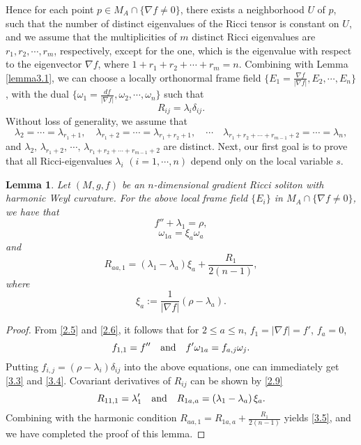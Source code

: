 \documentclass{amsart}
\newtheorem{lemma}[theorem]{Lemma}
\theoremstyle{definition}
\theoremstyle{remark}
\numberwithin{equation}{section}
\begin{document}
	Hence for each point $p\in M_A \cap \{ \nabla f \neq 0  \}$, there exists a neighborhood $U$ of $p$, 
	such that the number of distinct eigenvalues of the Ricci tensor is constant on $U$,
	and we assume that the multiplicities of $m$ distinct Ricci eigenvalues are $r_{1}, r_{2}, \cdots, r_{m}$, respectively, 
	except for the one, which is the eigenvalue with respect to the eigenvector $\nabla f$,
	where $1+r_{1}+r_{2}+ \cdots+ r_{m}=n $.
	Combining with Lemma \ref{lemma3.1},
	we can choose a locally orthonormal frame field
	$\{E_1= \frac{\nabla f}{|\nabla f| }, E_2, \cdots,  E_n\}$,
	with the dual $\{\omega_1= \frac{d f}{|\nabla f| }, \omega_2, \cdots, \omega_n\}$
	such that 
	\begin{equation}\label{3.2}
	R_{ij}=\lambda_i \delta_{ij}.
	\end{equation}
	Without loss of generality, we assume that 
	\[
	\lambda_{2}=\cdots=\lambda_{r_1+1}, \quad
	\lambda_{r_1+2}=\cdots=\lambda_{r_1+r_2+1},\quad
	\cdots  \quad 
	\lambda_{r_1+r_2+\cdots+r_{m-1}+2}=\cdots=\lambda_{n},
	\]
	and $\lambda_{2},\, \lambda_{r_1+2},\,\cdots,\,	\lambda_{r_1+r_2+\cdots+r_{m-1}+2}$
	are distinct.
	Next, our first goal is to prove that all Ricci-eigenvalues $ \lambda_i $ $(i=1, \cdots ,n)$
	depend only on the local variable $s$.
	\begin{lemma} \label{lemma3.2}
		Let $(M, g, f)$ be an $n$-dimensional gradient Ricci soliton  with harmonic Weyl curvature.
		For the above local frame field $\{ E_i \}$ in $M_{A} \cap \{ \nabla f \neq 0 \}$, we have that
	\begin{equation}\label{3.3}
	f''+\lambda_1=\rho,
	\end{equation}
	\begin{equation}\label{3.4}
	\omega_{1a}= \xi_a \omega_{a}
	\end{equation}
	and 
	\begin{equation}\label{3.5}
	R_{aa,1}
	=\left(\lambda_1-\lambda_a \right)\xi_a+\frac{R_1}{2(n-1)},
	\end{equation}
	where 
	\begin{equation} \label{3.6}
	\xi_a:= \frac{1}{ |\nabla f|} (\rho-\lambda_{a}).
	\end{equation} 
	\end{lemma}
	\begin{proof}

	From \eqref{2.5} and \eqref{2.6}, it follows that for $2\leq a \leq n$, $f_{1}=|\nabla f|=f'$, $f_{a}=0$, 
    \[
	f_{1,1}=f'' \quad  {\rm and} \quad  f'\omega_{1a}=f_{a,j}\omega_{j}.
    \]
	Putting $f_{i,j}=\left(\rho-\lambda_i \right)\delta_{ij}$ into the above equations, 
	one can immediately get \eqref{3.3} and \eqref{3.4}.
	Covariant derivatives of $R_{ij}$ can be shown by \eqref{2.9}
  \[
	R_{11,1}=\lambda_1'  \quad {\rm and} \quad 
   R_{1a,a}=\left(\lambda_1-\lambda_a \right)\xi_a.
  \]
	Combining with the harmonic condition $R_{aa,1}=R_{1a,a}+\frac{R_1}{2(n-1)}$ yields \eqref{3.5},
	and we have completed the proof of this lemma.
	\end{proof}
\end{document}
